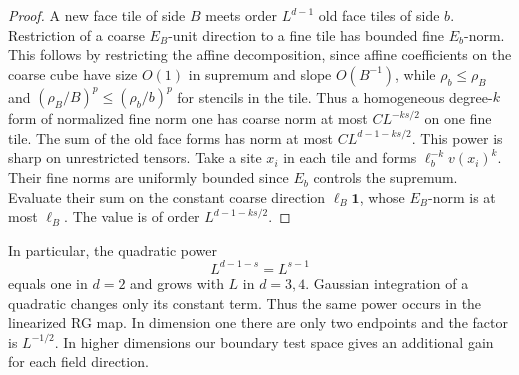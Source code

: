 \documentclass[11pt]{article}
\theoremstyle{definition}
\begin{document}
\begin{proof}
A new face tile of side \(B\) meets order \(L^{d-1}\) old face
tiles of side \(b\). Restriction of a coarse \(E_B\)-unit direction
to a fine tile has bounded fine \(E_b\)-norm. This follows by
restricting the affine decomposition, since affine coefficients
on the coarse cube have size \(O(1)\) in supremum and slope
\(O(B^{-1})\), while \(\rho_b\le\rho_B\) and
\((\rho_B/B)^p\le(\rho_b/b)^p\) for stencils in the tile.
Thus a homogeneous degree-\(k\) form of normalized fine norm one
has coarse norm at most \(C L^{-ks/2}\) on one fine tile. The sum of
the old face forms has norm at most \(C L^{d-1-ks/2}\).
This power is sharp on unrestricted tensors. Take a site \(x_i\)
in each tile and forms \(\ell_b^{-k}v(x_i)^k\). Their fine norms
are uniformly bounded since \(E_b\) controls the supremum. Evaluate
their sum on the constant coarse direction \(\ell_B\mathbf 1\),
whose \(E_B\)-norm is at most \(\ell_B\). The value is of order
\(L^{d-1-ks/2}\).
\end{proof}

In particular, the quadratic power
\begin{equation}
 L^{d-1-s}=L^{s-1}
\end{equation}
equals one in \(d=2\) and grows with \(L\) in \(d=3,4\).
Gaussian integration of a quadratic changes only its constant
term. Thus the same power occurs in the linearized RG map.
In dimension one there are only two endpoints and the factor is \(L^{-1/2}\). In higher
dimensions our boundary test space gives an additional gain for each
field direction.
\end{document}
